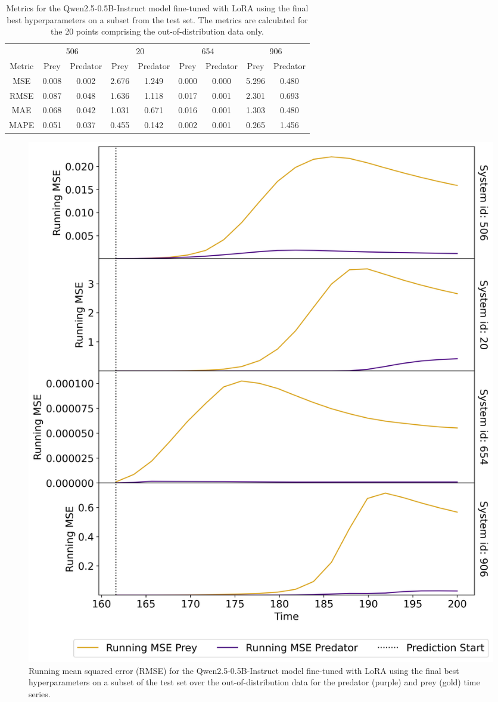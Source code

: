 \documentclass[11pt,a4paper]{article}
\begin{document}
\begin{table}
    \centering
    \begin{tabular}{c|c|c|c|c|c|c|c|c}
        & \multicolumn{2}{c|}{506} & \multicolumn{2}{c|}{20} & \multicolumn{2}{c|}{654} & \multicolumn{2}{|c}{906} \\
        Metric & Prey & Predator & Prey & Predator & Prey & Predator & Prey & Predator \\
        \hline
        MSE & 0.008 & 0.002 & 2.676 & 1.249 & 0.000 & 0.000 & 5.296 & 0.480 \\
        RMSE & 0.087 & 0.048 & 1.636 & 1.118 & 0.017 & 0.001 & 2.301 & 0.693 \\
        MAE & 0.068 & 0.042 & 1.031 & 0.671 & 0.016 & 0.001 & 1.303 & 0.480 \\
        MAPE & 0.051 & 0.037 & 0.455 & 0.142 & 0.002 & 0.001 & 0.265 & 1.456 \\        
    \end{tabular}
    \caption{Metrics for the Qwen2.5-0.5B-Instruct model fine-tuned with LoRA using the final best hyperparameters on a subset from the test set. The metrics are calculated for the 20 points comprising the out-of-distribution data only.}
    \label{tab:lora_final_metrics}
\end{table}

\begin{figure}
    \centering
    \includegraphics[width=\columnwidth, keepaspectratio]{../plots/running_mse_lora_final.png}
    \caption{Running mean squared error (RMSE) for the Qwen2.5-0.5B-Instruct model fine-tuned with LoRA using the final best hyperparameters on a subset of the test set over the out-of-distribution data for the predator (purple) and prey (gold) time series.}
    \label{fig:lora_final_rmse}
\end{figure}
\end{document}

